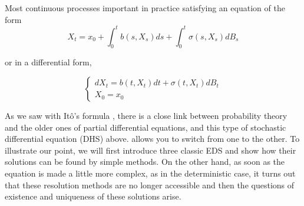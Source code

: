 	Most continuous processes important in practice satisfying an equation of the form
	$$
	X_{t}=x_{0}+\int_{0}^{t} b\left(s, X_{s}\right) d s+\int_{0}^{t} \sigma\left(s, X_{s}\right) d B_{s}
	$$

	or in a differential form,

	$$
	\left\{\begin{array}{l}
	{d X_{t}=b\left(t, X_{t}\right) d t+\sigma\left(t, X_{t}\right) d B_{t}} \\
	{X_{0}=x_{0}}
	\end{array}\right.
	$$

	As we saw with Itô's formula , there is a close link between probability theory and the older ones of partial differential equations, and this type of stochastic differential equation (DHS) above. allows you to switch from one to the other. To illustrate our point, we will first introduce three classic EDS and show how their solutions can be found by simple methods. On the other hand, as soon as the equation is made a little more complex, as in the deterministic case, it turns out that these resolution methods are no longer accessible and then the questions of existence and uniqueness of these solutions arise.
